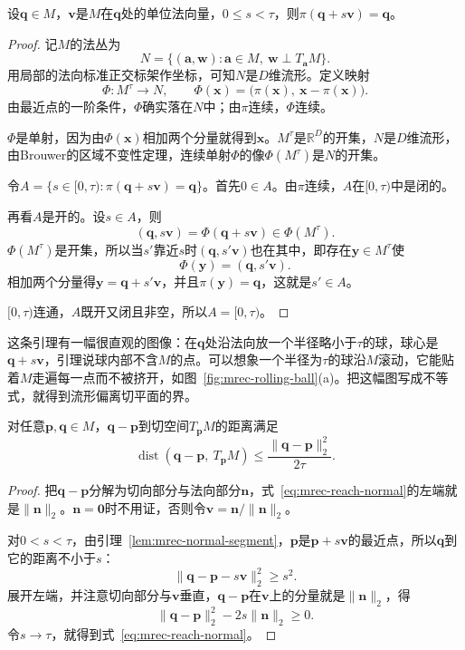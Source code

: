 \begin{lemma}[法向线段]
\label{lem:mrec-normal-segment}
设$\bm q\in M$，$\bm v$是$M$在$\bm q$处的单位法向量，$0\leq s<\tau$，则$\pi(\bm q+s\bm v)=\bm q$。
\end{lemma}
\begin{proof}
记$M$的法丛为
\[
 N=\{(\bm a,\bm w):\bm a\in M,\ \bm w\perp T_{\bm a}M\}.
\]
用局部的法向标准正交标架作坐标，可知$N$是$D$维流形。定义映射
\[
 \Phi:M^\tau\to N,\qquad\Phi(\bm x)=\bigl(\pi(\bm x),\ \bm x-\pi(\bm x)\bigr).
\]
由最近点的一阶条件，$\Phi$确实落在$N$中；由$\pi$连续，$\Phi$连续。

$\Phi$是单射，因为由$\Phi(\bm x)$相加两个分量就得到$\bm x$。$M^\tau$是$\mathbb R^D$的开集，$N$是$D$维流形，由Brouwer的区域不变性定理，连续单射$\Phi$的像$\Phi(M^\tau)$是$N$的开集。

令$A=\{s\in[0,\tau):\pi(\bm q+s\bm v)=\bm q\}$。首先$0\in A$。由$\pi$连续，$A$在$[0,\tau)$中是闭的。

再看$A$是开的。设$s\in A$，则
\[
 (\bm q,s\bm v)=\Phi(\bm q+s\bm v)\in\Phi(M^\tau).
\]
$\Phi(M^\tau)$是开集，所以当$s'$靠近$s$时$(\bm q,s'\bm v)$也在其中，即存在$\bm y\in M^\tau$使
\[
 \Phi(\bm y)=(\bm q,s'\bm v).
\]
相加两个分量得$\bm y=\bm q+s'\bm v$，并且$\pi(\bm y)=\bm q$，这就是$s'\in A$。

$[0,\tau)$连通，$A$既开又闭且非空，所以$A=[0,\tau)$。
\end{proof}

这条引理有一幅很直观的图像：在$\bm q$处沿法向放一个半径略小于$\tau$的球，球心是$\bm q+s\bm v$，引理说球内部不含$M$的点。可以想象一个半径为$\tau$的球沿$M$滚动，它能贴着$M$走遍每一点而不被挤开，如图~\ref{fig:mrec-rolling-ball}(a)。把这幅图写成不等式，就得到流形偏离切平面的界。

\begin{lemma}[法向偏离]
\label{lem:mrec-normal-distance}
对任意$\bm p,\bm q\in M$，$\bm q-\bm p$到切空间$T_{\bm p}M$的距离满足
\begin{equation}
 \operatorname{dist}(\bm q-\bm p,\ T_{\bm p}M)\leq\frac{\lVert\bm q-\bm p\rVert_2^2}{2\tau}.
 \label{eq:mrec-reach-normal}
\end{equation}
\end{lemma}
\begin{proof}
把$\bm q-\bm p$分解为切向部分与法向部分$\bm n$，式~\eqref{eq:mrec-reach-normal}的左端就是$\lVert\bm n\rVert_2$。$\bm n=\bm 0$时不用证，否则令$\bm v=\bm n/\lVert\bm n\rVert_2$。

对$0<s<\tau$，由引理~\ref{lem:mrec-normal-segment}，$\bm p$是$\bm p+s\bm v$的最近点，所以$\bm q$到它的距离不小于$s$：
\[
 \lVert\bm q-\bm p-s\bm v\rVert_2^2\geq s^2 .
\]
展开左端，并注意切向部分与$\bm v$垂直，$\bm q-\bm p$在$\bm v$上的分量就是$\lVert\bm n\rVert_2$，得
\[
 \lVert\bm q-\bm p\rVert_2^2-2s\lVert\bm n\rVert_2\geq0 .
\]
令$s\to\tau$，就得到式~\eqref{eq:mrec-reach-normal}。
\end{proof}

